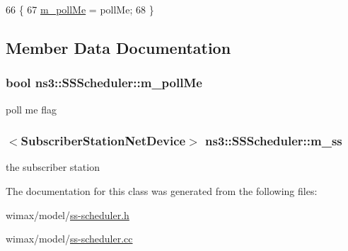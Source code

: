 \begin{DoxyCode}
66 \{
67   \hyperlink{classns3_1_1SSScheduler_a2e2bc18b11bd58e62fd69cca83994ea0}{m\_pollMe} = pollMe;
68 \}
\end{DoxyCode}


\subsection{Member Data Documentation}
\subsubsection[{\texorpdfstring{m\+\_\+poll\+Me}{m_pollMe}}]{\setlength{\rightskip}{0pt plus 5cm}bool ns3\+::\+S\+S\+Scheduler\+::m\+\_\+poll\+Me\hspace{0.3cm}{\ttfamily [private]}}\hypertarget{classns3_1_1SSScheduler_a2e2bc18b11bd58e62fd69cca83994ea0}{}\label{classns3_1_1SSScheduler_a2e2bc18b11bd58e62fd69cca83994ea0}


poll me flag 

\subsubsection[{\texorpdfstring{m\+\_\+ss}{m_ss}}]{$<${\bf Subscriber\+Station\+Net\+Device}$>$ ns3\+::\+S\+S\+Scheduler\+::m\+\_\+ss\hspace{0.3cm}{\ttfamily [private]}}\hypertarget{classns3_1_1SSScheduler_a9a0b3cae20f18593e3d150e7534ce678}{}\label{classns3_1_1SSScheduler_a9a0b3cae20f18593e3d150e7534ce678}


the subscriber station 



The documentation for this class was generated from the following files\+:\begin{DoxyCompactItemize}
\item 
wimax/model/\hyperlink{ss-scheduler_8h}{ss-\/scheduler.\+h}\item 
wimax/model/\hyperlink{ss-scheduler_8cc}{ss-\/scheduler.\+cc}\end{DoxyCompactItemize}
